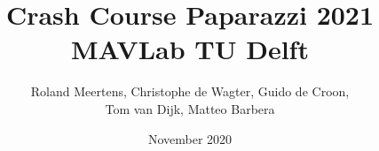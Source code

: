 \documentclass{report}
\begin{document}
\author{Roland Meertens, Christophe de Wagter, Guido de Croon,\\Tom van Dijk, Matteo Barbera}
\title{\bf Crash Course Paparazzi 2021\\MAVLab TU Delft}
\date{November 2020}
\maketitle

\tableofcontents

\setlength{\parindent}{0em}





	
\end{document}
